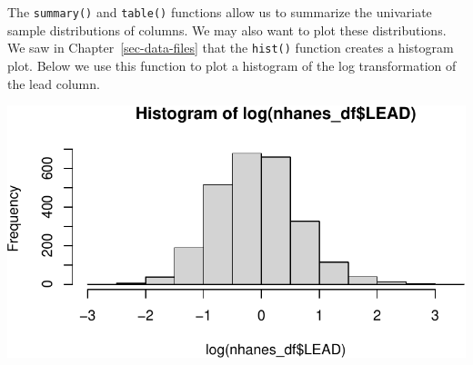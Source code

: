 \documentclass[
  letterpaper,
]{krantz}
\makeatletter
\newenvironment{Shaded}{\begin{snugshade}}{\end{snugshade}}
\newcommand{\CommentTok}[1]{\textcolor[rgb]{0.37,0.37,0.37}{#1}}
\newcommand{\FunctionTok}[1]{\textcolor[rgb]{0.28,0.35,0.67}{#1}}
\newcommand{\NormalTok}[1]{\textcolor[rgb]{0.00,0.23,0.31}{#1}}
\newcommand{\OtherTok}[1]{\textcolor[rgb]{0.00,0.23,0.31}{#1}}
\newcommand{\SpecialCharTok}[1]{\textcolor[rgb]{0.37,0.37,0.37}{#1}}
\newcommand{\StringTok}[1]{\textcolor[rgb]{0.13,0.47,0.30}{#1}}
\newenvironment{kframe}{%
\medskip{}
\setlength{\fboxsep}{.8em}
 \def\at@end@of@kframe{}%
 \ifinner\ifhmode%
  \def\at@end@of@kframe{\end{minipage}}%
  \begin{minipage}{\columnwidth}%
 \fi\fi%
 \def\FrameCommand##1{\hskip\@totalleftmargin \hskip-\fboxsep
 \colorbox{shadecolor}{##1}\hskip-\fboxsep
     \hskip-\linewidth \hskip-\@totalleftmargin \hskip\columnwidth}%
 \MakeFramed {\advance\hsize-\width
   \@totalleftmargin\z@ \linewidth\hsize
   \@setminipage}}%
 {\par\unskip\endMakeFramed%
 \at@end@of@kframe}
\renewenvironment{Shaded}{\begin{kframe}}{\end{kframe}}
\makeatother
\begin{document}
\begin{Shaded}
\end{Shaded}

The \texttt{summary()} and \texttt{table()} functions allow us to
summarize the univariate sample distributions of columns. We may also
want to plot these distributions. We saw in Chapter~\ref{sec-data-files}
that the \texttt{hist()} function creates a histogram plot. Below we use
this function to plot a histogram of the log transformation of the lead
column.

\begin{Shaded}
\end{Shaded}

\begin{center}
\includegraphics[width=1\textwidth,height=\textheight]{book/exploratory_analysis_files/figure-pdf/unnamed-chunk-8-1.pdf}
\end{center}
\end{document}
